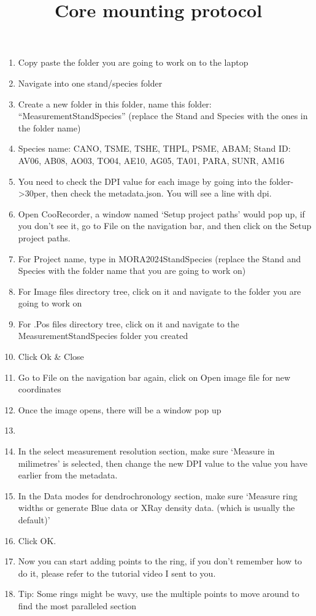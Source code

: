 \documentclass[11pt,letter]{article}
\begin{document}
\title{Core mounting protocol} 

\setlength{\parindent}{0pt}
\setlength{\parskip}{3pt}
\begin{enumerate}
\item Copy paste the folder you are going to work on to the laptop
\item Navigate into one stand/species folder
\item Create a new folder in this folder, name this folder: ``MeasurementStandSpecies'' (replace the Stand and Species with the ones in the folder name)
\item Species name: CANO, TSME, TSHE, THPL, PSME, ABAM; Stand ID: AV06, AB08, AO03, TO04, AE10, AG05, TA01, PARA, SUNR, AM16
\item You need to check the DPI value for each image by going into the folder->30per, then check the metadata.json. You will see a line with dpi.
\item Open CooRecorder, a window named `Setup project paths' would pop up, if you don't see it, go to File on the navigation bar, and then click on the Setup project paths.
\item For Project name, type in MORA2024StandSpecies (replace the Stand and Species with the folder name that you are going to work on)
\item For Image files directory tree, click on it and navigate to the folder you are going to work on
\item For .Pos files directory tree, click on it and navigate to the MeasurementStandSpecies folder you created
\item Click Ok \& Close
\item Go to File on the navigation bar again, click on Open image file for new coordinates
\item Once the image opens, there will be a window pop up
\item 
\item In the select measurement resolution section, make sure `Measure in milimetres' is selected, then change the new DPI value to the value you have earlier from the metadata.
\item In the Data modes for dendrochronology section, make sure `Measure ring widths or generate Blue data or XRay density data. (which is usually the default)'
\item Click OK.
\item Now you can start adding points to the ring, if you don't remember how to do it, please refer to the tutorial video I sent to you.
\item Tip: Some rings might be wavy, use the multiple points to move around to find the most paralleled section

\end{enumerate}
\end{document}
